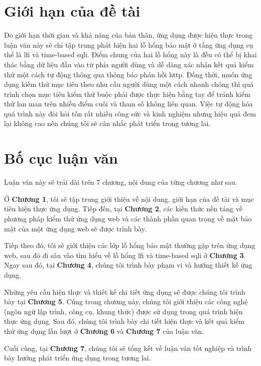 \section{Giới hạn của đề tài}
Do giới hạn thời gian và khả năng của bản thân, ứng dụng được hiện thực trong luận văn này sẽ chỉ tập trung phát hiện hai lỗ hổng bảo mật ở tầng ứng dụng cụ thể là \acrfull{lfi} và time-based \acrfull{sqli}. Điểm chung của hai lỗ hổng này là đều có thể bị khai thác bằng dữ liệu đầu vào từ phía người dùng và dễ dàng xác nhận kết quả kiểm thử một cách tự động thông qua thông báo phản hồi \acrshort{http}. Đồng thời, muốn ứng dụng kiếm thử mục tiêu theo nhu cầu người dùng một cách nhanh chóng thì quá trình chọn mục tiêu kiểm thử buộc phải được thực hiện bằng tay để tránh kiểm thử lan man trên nhiều điểm cuối và tham số không liên quan. Việc tự động hóa quá trình này đòi hỏi tốn rất nhiều công sức và kinh nghiệm nhưng hiệu quả đem lại không cao nên chúng tôi sẽ cân nhắc phát triển trong tương lai.

\section{Bố cục luận văn}
Luận văn này sẽ trải dài trên 7 chương, nội dung của từng chương như sau. \par
Ở \textbf{Chương 1}, tôi sẽ tập trung giới thiệu về nội dung, giới hạn của đề tài và mục tiêu hiện thực ứng dụng. Tiếp đến, tại \textbf{Chương 2}, các kiến thức nền tảng về phương pháp kiểm thử ứng dụng web và các thành phần quan trọng về mặt bảo mật của một ứng dụng web sẽ được trình bày. \par
Tiếp theo đó, tôi sẽ giới thiệu các lớp lỗ hổng bảo mật thường gặp trên ứng dụng web, sau đó đi sâu vào tìm hiểu về lỗ hổng \acrshort{lfi} và time-based \acrshort{sqli} ở \textbf{Chương 3}. Ngay sau đó, tại \textbf{Chương 4}, chúng tôi trình bày phạm vi và hướng thiết kế ứng dụng.\par
Những yêu cầu hiện thực và thiết kế chi tiết ứng dụng sẽ được chúng tôi trình bày tại \textbf{Chương 5}. Cũng trong chương này, chúng tôi giới thiệu các công nghệ (ngôn ngữ lập trình, công cụ, khung thức) được sử dụng trong quá trình hiện thực ứng dụng. Sau đó, chúng tôi trình bày chi tiết hiện thực và kết quả kiểm thử ứng dụng lần lượt ở \textbf{Chương 6} và \textbf{Chương 7} của luận văn. \par
Cuối cùng, tại \textbf{Chương 7}, chúng tôi sẽ tổng kết về luận văn tốt nghiệp và trình bày hướng phát triển ứng dụng trong tương lai.
